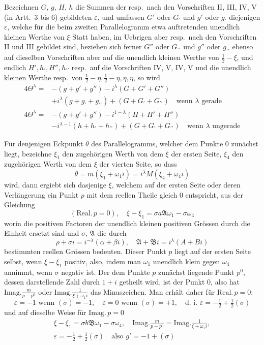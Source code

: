 Bezeichnen $G$, $g$, $H$, $h$ die Summen der resp.\ nach den Vorschriften II, III, IV, V (in Artt.\ $3$ bis $6$) gebildeten $\varepsilon$, und umfassen $G'$ oder $G_{\prime}$ und $g'$ oder $g_{\prime}$ diejenigen $\varepsilon$, welche für die beim zweiten Parallelogramm etwa auftretenden unendlich kleinen Werthe von $\xi$ Statt haben, im Uebrigen aber resp.\ nach den Vorschriften II und III gebildet sind, beziehen sich ferner $G''$ oder $G_{\prime\prime}$ und $g''$ oder $g_{\prime\prime}$ ebenso auf dieselben Vorschriften aber auf die unendlich kleinen Werthe von $\tfrac12-\xi$, und endlich $H',h_{\prime},H'',h_{\prime\prime}$ resp.\ auf die Vorschriften IV, V, IV, V und die unendlich kleinen Werthe resp.\ von $\tfrac12-\eta,\tfrac12-\eta,\eta,\eta$, so wird
\[
\begin{aligned}
4\Theta^\lambda={}&-(g+g'+g'')-i^\lambda(G+G'+G'')\\
&+i^\lambda(g+g_{\prime}+g_{\prime\prime})+(G+G_{\prime}+G_{\prime\prime})\quad\text{wenn }\lambda\text{ gerade}\\
4\Theta^\lambda={}&-(g+g'+g'')-i^{1-\lambda}(H+H'+H'')\\
&-i^{\lambda-1}(h+h_{\prime}+h_{\prime\prime})+(G+G_{\prime}+G_{\prime\prime})\quad\text{wenn }\lambda\text{ ungerade}
\end{aligned}
\]

Für denjenigen Eckpunkt $\theta$ des Parallelogramms, welcher dem Punkte $0$ zunächst liegt, bezeichne $\xi_1$ den zugehörigen Werth von dem $\xi$ der ersten Seite, $\xi_4$ den zugehörigen Werth von dem $\xi$ der vierten Seite, so dass
\[
\theta=m(\xi_1+\omega_1i)=i^\lambda M(\xi_4+\omega_4i)
\]
wird, dann ergiebt sich dasjenige $\xi$, welchem auf der ersten Seite oder deren Verlängerung ein Punkt $p$ mit dem reellen Theile gleich $0$ entspricht, aus der Gleichung
\[
(\mathrm{Real.}\,p=0),\quad\xi-\xi_1=\sigma a\mathfrak A\omega_1-\sigma\omega_4
\]
worin die positiven Factoren der unendlich kleinen positiven Grössen durch die Einheit ersetzt sind und $\sigma$, $\mathfrak A$ die durch
\[
\rho+\sigma i=i^{-\lambda}(\alpha+\beta i),\quad\mathfrak A+\mathfrak B i=i^\lambda(A+Bi)
\]
bestimmten reellen Grössen bedeuten. Dieser Punkt $p$ liegt auf der ersten Seite selbst, wenn $\xi-\xi_1$ positiv, also, indem man $\omega_1$ unendlich klein gegen $\omega_4$ annimmt, wenn $\sigma$ negativ ist. Der dem Punkte $p$ zunächst liegende Punkt $p^0$, dessen darstellende Zahl durch $1+i$ getheilt wird, ist der Punkt $0$, also hat
%
$\mathrm{Imag.}\frac m{p-p^0}$ oder $\mathrm{Imag.}\frac1{\xi+\omega_1i}$ das Minuszeichen. Man erhält daher für $\mathrm{Real.}\,p=0$:
\[
\varepsilon=-1\text{ wenn }(\sigma)=-1,\quad\varepsilon=0\text{ wenn }(\sigma)=+1,\quad\text{d. i. }\varepsilon=-\tfrac12+\tfrac12(\sigma)
\]
und auf dieselbe Weise für $\mathrm{Imag.}\,p=0$
\[
\begin{gathered}
\xi-\xi_1=\sigma b\mathfrak B\omega_1-\sigma\omega_4,\quad\mathrm{Imag.}\frac m{p-p^0}=\mathrm{Imag.}\frac1{\xi+\omega_1i},\\
\varepsilon=-\tfrac12+\tfrac12(\sigma)\quad\text{also }g'=-1+(\sigma)
\end{gathered}
\]

